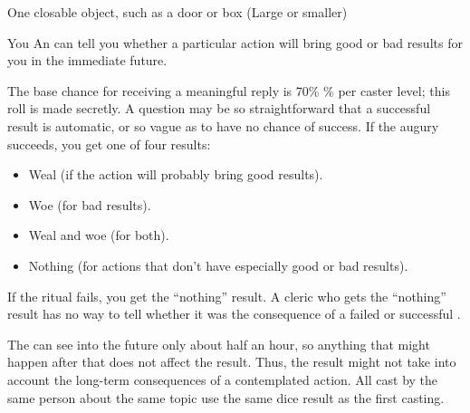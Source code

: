 \begin{spelltarget}{One closable object, such as a door or box (Large or smaller)}
\begin{spelltarget}{You}
\spelleffect An  can tell you whether a particular action will bring good or bad results for you in the immediate future.
\par The base chance for receiving a meaningful reply is 70\% \% per caster level; this roll is made secretly. A question may be so straightforward that a successful result is automatic, or so vague as to have no chance of success. If the augury succeeds, you get one of four results:
\begin{itemize}
    \item Weal (if the action will probably bring good results).
    \item Woe (for bad results).
    \item Weal and woe (for both).
    \item Nothing (for actions that don't have especially good or bad results).
\end{itemize}
\par If the ritual fails, you get the ``nothing'' result. A cleric who gets the ``nothing'' result has no way to tell whether it was the consequence of a failed or successful .
\par The  can see into the future only about half an hour, so anything that might happen after that does not affect the result. Thus, the result might not take into account the long-term consequences of a contemplated action. All  cast by the same person about the same topic use the same dice result as the first casting.


\end{spelltarget}
\end{spelltarget}

